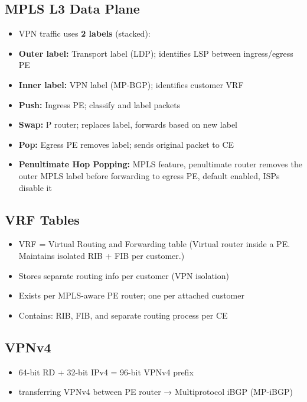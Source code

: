 \begin{multicols*}{5}
		\subsection{MPLS L3 Data Plane}
		\begin{itemize}
			\item VPN traffic uses \textbf{2 labels} (stacked):
			\item \textbf{Outer label:} Transport label (LDP); identifies LSP between ingress/egress PE
			\item \textbf{Inner label:} VPN label (MP-BGP); identifies customer VRF
			\item \textbf{Push:} Ingress PE; classify and label packets
			\item \textbf{Swap:} P router; replaces label, forwards based on new label
			\item \textbf{Pop:} Egress PE removes label; sends original packet to CE
			\item \textbf{Penultimate Hop Popping:} MPLS feature, penultimate router removes the outer MPLS label before forwarding to egress PE, default enabled, ISPs disable it
		\end{itemize}
		
		\subsection{VRF Tables}
		\begin{itemize}
			\item VRF = Virtual Routing and Forwarding table (Virtual router inside a PE. Maintains isolated RIB + FIB per customer.)
			\item Stores separate routing info per customer (VPN isolation)
			\item Exists per MPLS-aware PE router; one per attached customer
			\item Contains: RIB, FIB, and separate routing process per CE
		\end{itemize}
		
		
		\subsection{VPNv4}
		\begin{itemize}
			\item 64-bit RD + 32-bit IPv4 = 96-bit VPNv4 prefix
			\item transferring VPNv4 between PE router → Multiprotocol iBGP (MP-iBGP)
		\end{itemize}
		

\end{multicols*}
